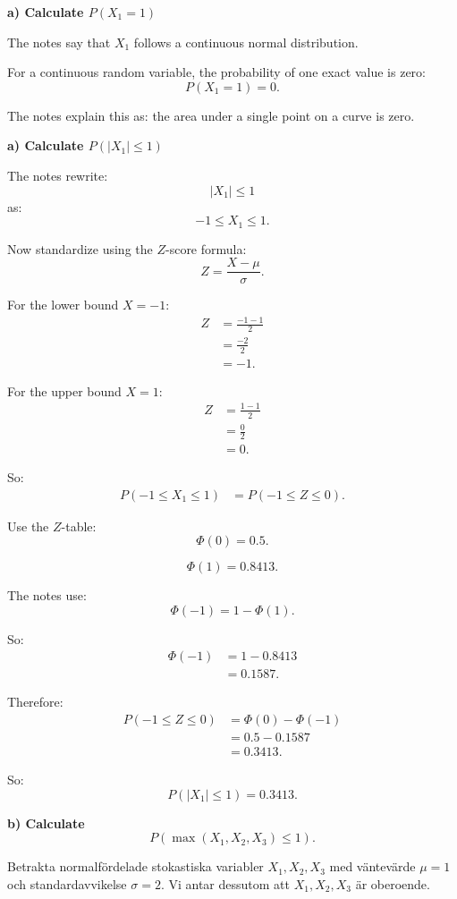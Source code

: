 \documentclass[10pt]{article}
\begin{document}
\textbf{a) Calculate \(P(X_1=1)\)}

The notes say that \(X_1\) follows a continuous
normal distribution.

For a continuous random variable, the probability of
one exact value is zero:
\[
P(X_1=1)=0.
\]

The notes explain this as:
the area under a single point on a curve is zero.

\textbf{a) Calculate \(P(|X_1|\le 1)\)}

The notes rewrite:
\[
|X_1|\le 1
\]
as:
\[
-1\le X_1\le 1.
\]

Now standardize using the \(Z\)-score formula:
\[
Z=\frac{X-\mu}{\sigma}.
\]

For the lower bound \(X=-1\):
\begin{align*}
Z
&=
\frac{-1-1}{2}
\\[2mm]
&=
\frac{-2}{2}
\\[2mm]
&=-1.
\end{align*}

For the upper bound \(X=1\):
\begin{align*}
Z
&=
\frac{1-1}{2}
\\[2mm]
&=
\frac{0}{2}
\\[2mm]
&=0.
\end{align*}

So:
\begin{align*}
P(-1\le X_1\le 1)
&=
P(-1\le Z\le 0).
\end{align*}

Use the \(Z\)-table:
\[
\Phi(0)=0.5.
\]

\[
\Phi(1)=0.8413.
\]

The notes use:
\[
\Phi(-1)=1-\Phi(1).
\]

So:
\begin{align*}
\Phi(-1)
&=
1-0.8413
\\[2mm]
&=
0.1587.
\end{align*}

Therefore:
\begin{align*}
P(-1\le Z\le 0)
&=
\Phi(0)-\Phi(-1)
\\[2mm]
&=
0.5-0.1587
\\[2mm]
&=
0.3413.
\end{align*}

So:
\[
P(|X_1|\le 1)=0.3413.
\]

\textbf{b) Calculate}
\[
P(\max(X_1,X_2,X_3)\le 1).
\]

Betrakta normalfördelade stokastiska variabler
\(X_1,X_2,X_3\) med väntevärde \(\mu=1\) och
standardavvikelse \(\sigma=2\). Vi antar dessutom
att \(X_1,X_2,X_3\) är oberoende.
\end{document}
